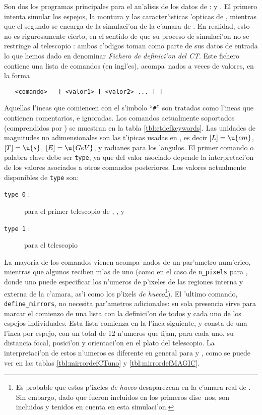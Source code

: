 Son dos los programas principales para el an'alisis de los datos de
\MC:  y \camera. El primero intenta simular los espejos, la
montura y las caracter'isticas 'opticas de \MAGIC, mientras que el
segundo se encarga de la simulaci'on de la c'amara de \MAGIC. En
realidad, esto no es rigurosamente cierto, en el sentido de que su
proceso de simulaci'on no se restringe al telescopio \MAGIC: ambos
c'odigos toman como parte de sus datos de entrada lo que hemos dado en
denominar \emph{Fichero de definici'on del CT}.  Este fichero contiene
una lista de comandos (en ingl'es), acompa~nados a veces de valores,
en la forma
%
\begin{verbatim}
   <comando>   [ <valor1> [ <valor2> ... ] ]
\end{verbatim}
%
Aquellas l'ineas que comiencen con el s'imbolo ``\texttt{\#}'' son
tratadas como l'ineas que contienen comentarios, e ignoradas.  Los
comandos actualmente soportados (comprendidos por ) se
muestran en la tabla \ref{tbl:ctdefkeywords}.  Las unidades de
magnitudes no adimensionales son las t'ipicas usadas en \CORSIKA, es
decir $[L]=\u{cm}$, $[T]=\u{s}$, $[E]=\u{GeV}$, y radianes para los
'angulos.  El primer comando o palabra clave debe ser \texttt{type},
ya que del valor asociado depende la interpretaci'on de los valores
asociados a otros comandos posteriores.  Los valores actualmente
disponibles de \texttt{type} son:
%
\begin{description}
\item[\texttt{type 0} :] para el primer telescopio de \HEGRA, \CTuno, y
\item[\texttt{type 1} :] para el telescopio \MAGIC
\end{description}
%
La mayoria de los comandos vienen acompa~nados de un par'ametro
num'erico, mientras que algunos reciben m'as de uno (como en el caso
de \texttt{n\_pixels} para \MAGIC, donde uno puede especificar los
n'umeros de p'ixeles de las regiones interna y externa de la c'amara,
as'i como los p'ixels \emph{de hueco}\footnote{Es probable que estos
  p'ixeles \emph{de hueco} desaparezcan en la c'amara real de \MAGIC.
  Sin embargo, dado que fueron incluidos en los primeros dise~nos, son
  incluidos y tenidos en cuenta en esta simulaci'on.}).  El 'ultimo
comando, \texttt{define\_mirrors}, no necesita par'ametros
adicionales: su sola presencia sirve para marcar el comienzo de una
lista con la definici'on de todos y cada uno de los espejos
individuales.  Esta lista comienza en la l'inea siguiente, y consta de
una l'inea por espejo, con un total de 12 n'umeros que fijan, para
cada uno, su distancia focal, posici'on y orientaci'on en el plato del
telescopio.  La interpretaci'on de estos n'umeros es diferente en
general para \MAGIC y \CTuno, como se puede ver en las tablas
\ref{tbl:mirrordefCTuno} y \ref{tbl:mirrordefMAGIC}.

